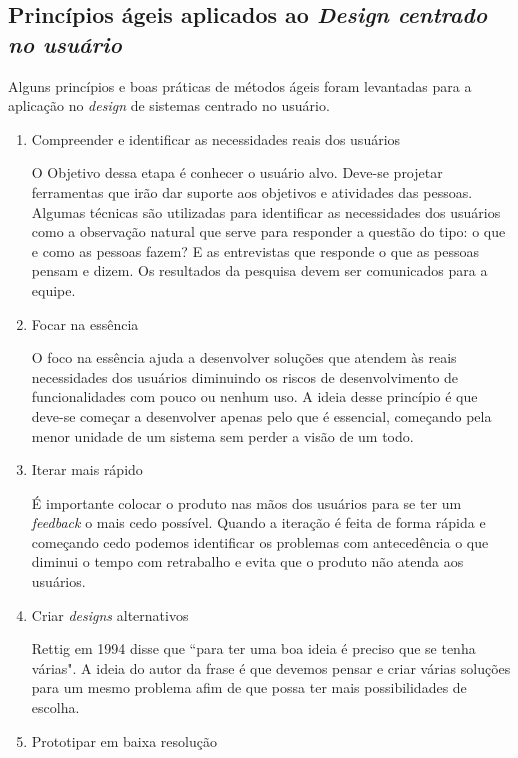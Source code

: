 \newpage

\subsection{Princípios ágeis aplicados ao \emph{Design centrado no usuário}}

	Alguns princípios e boas práticas de métodos ágeis foram levantadas para a aplicação no \emph{design} de sistemas centrado no usuário.

\begin{enumerate}

\item Compreender e identificar as necessidades reais dos usuários

O Objetivo dessa etapa é conhecer o usuário alvo. Deve-se projetar ferramentas que irão dar suporte aos objetivos e atividades das pessoas.
%
Algumas técnicas são utilizadas para identificar as necessidades dos usuários como a observação natural que serve para responder a questão do tipo: o que e como as pessoas fazem? E as entrevistas que responde o que as pessoas pensam e dizem. Os resultados da pesquisa devem ser comunicados para a equipe.

\item Focar na essência

O foco na essência ajuda a desenvolver soluções que atendem às reais necessidades dos usuários diminuindo os riscos de desenvolvimento de funcionalidades com pouco ou nenhum uso.
%
A ideia desse princípio é que deve-se começar a desenvolver apenas pelo que é essencial, começando pela menor unidade de um sistema sem perder a visão de um todo.

\item Iterar mais rápido

	É importante colocar o produto nas mãos dos usuários para se ter um \textit{feedback} o mais cedo possível. Quando a iteração é feita de forma rápida e começando cedo podemos identificar os problemas com antecedência o que diminui o tempo com retrabalho e evita que o produto não atenda aos usuários.
	

\item Criar \emph{designs} alternativos

	Rettig em 1994 disse que ``para ter uma boa ideia é preciso que se tenha várias". A ideia do autor da frase é que devemos pensar e criar várias soluções para um mesmo problema afim de que possa ter mais possibilidades de escolha. 


\item Prototipar em baixa resolução


\end{enumerate}
